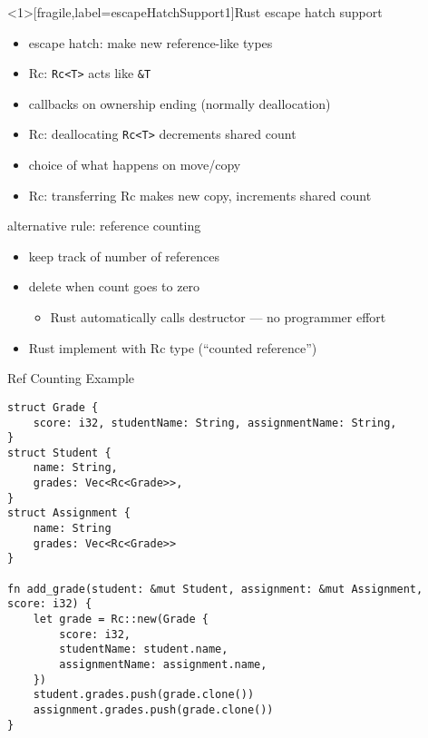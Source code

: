 \begin{frame}<1>[fragile,label=escapeHatchSupport1]{Rust escape hatch support}
    \begin{itemize}
        \item escape hatch: make new reference-like types
        \item<2> Rc: \verb|Rc<T>| acts like \verb|&T|
        \item callbacks on ownership ending (normally deallocation)
        \item<2> Rc: deallocating \verb|Rc<T>| decrements shared count
        \item choice of what happens on move/copy
        \item<2> Rc: transferring Rc makes new copy, increments shared count
    \end{itemize}
\end{frame}
 
\begin{frame}[fragile,label=refCounting]{alternative rule: reference counting}
    \begin{itemize}
    \item keep track of number of references
    \item delete when count goes to zero
        \begin{itemize}
        \item Rust automatically calls destructor --- no programmer effort
        \end{itemize}
    \item Rust implement with Rc type (``counted reference'')
    \end{itemize}
\end{frame}

\begin{frame}[fragile,label=refCountingEx]{Ref Counting Example}
\begin{verbatim}
struct Grade {
    score: i32, studentName: String, assignmentName: String,
}
struct Student {
    name: String,
    grades: Vec<Rc<Grade>>,
}
struct Assignment {
    name: String
    grades: Vec<Rc<Grade>>
}

fn add_grade(student: &mut Student, assignment: &mut Assignment, score: i32) {
    let grade = Rc::new(Grade {
        score: i32,
        studentName: student.name,
        assignmentName: assignment.name,
    })
    student.grades.push(grade.clone())
    assignment.grades.push(grade.clone())
}
\end{verbatim}
\end{frame}

